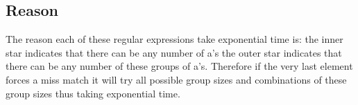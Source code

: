 \documentclass[a4paper, 1pt]{article}
\begin{document}
\subsection{Reason}
The reason each of these regular expressions take exponential time is: the inner star indicates that there can be any number of a's the outer star indicates that there can be any number of these groups of a's. Therefore if the very last element forces a miss match it will try all possible group sizes and combinations of these group sizes thus taking exponential time.
\end{document}
